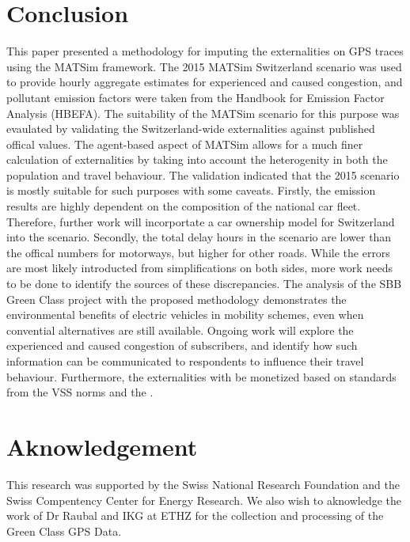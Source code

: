 \section{Conclusion}
This paper presented a methodology for imputing the externalities on GPS traces using the MATSim framework.
The 2015 MATSim Switzerland scenario was used to provide hourly aggregate estimates for experienced and caused congestion, and pollutant emission factors were taken from the Handbook for Emission Factor Analysis (HBEFA).
The suitability of the MATSim scenario for this purpose was evaulated by validating the Switzerland-wide externalities against published offical values.
The agent-based aspect of MATSim allows for a much finer calculation of externalities by taking into account the heterogenity in both the population and travel behaviour.
The validation indicated that the 2015 scenario is mostly suitable for such purposes with some caveats.
Firstly, the emission results are highly dependent on the composition of the national car fleet.
Therefore, further work will incorportate a car ownership model for Switzerland into the scenario.
Secondly, the total delay hours in the scenario are lower than the offical numbers for motorways, but higher for other roads.
While the errors are most likely introducted from simplifications on both sides, more work needs to be done to identify the sources of these discrepancies.
The analysis of the SBB Green Class project with the proposed methodology demonstrates the environmental benefits of electric vehicles in mobility schemes, even when convential alternatives are still available.
Ongoing work will explore the experienced and caused congestion of subscribers, and identify how such information can be communicated to respondents to influence their travel behaviour.
Furthermore, the externalities with be monetized based on standards from the VSS norms and the \citet{are2016externalcosts}.

\section{Aknowledgement}
This research was supported by the Swiss National Research Foundation and the Swiss Compentency Center for Energy Research. We also wish to aknowledge the work of Dr Raubal and IKG at ETHZ for the collection and processing of the Green Class GPS Data.
